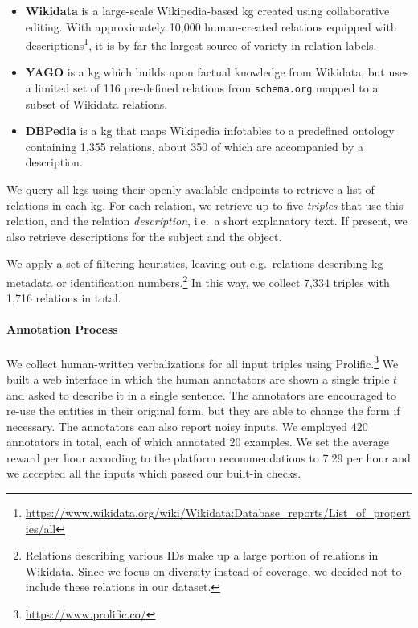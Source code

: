 \begin{itemize}
    \item \textbf{Wikidata} \cite{vrandevcic2014wikidata} is a large-scale Wikipedia-based \ac{kg} created using collaborative editing. With approximately 10,000 human-created relations equipped with descriptions\footnote{\url{https://www.wikidata.org/wiki/Wikidata:Database_reports/List_of_properties/all}}, it is by far the largest source of variety in relation labels.
    \item \textbf{YAGO} \cite{pellissier2020yago} is a \ac{kg} which builds upon factual knowledge from Wikidata, but uses a limited set of 116 pre-defined relations from \texttt{schema.org} \cite{guha2016schema} mapped to a subset of Wikidata relations.
    \item \textbf{DBPedia} \cite{auer2007dbpedia,lehmann2015dbpedia} is a \ac{kg} that maps Wikipedia infotables to a predefined ontology containing 1,355 relations, about 350 of which are accompanied by a description.
\end{itemize}

We query all \acp{kg} using their openly available endpoints to retrieve a list of relations in each \ac{kg}. For each relation, we retrieve up to five \textit{triples} that use this relation, and the relation \textit{description}, i.e.\ a short explanatory text.
If present, we also retrieve descriptions for the subject and the object.

We apply a set of filtering heuristics, leaving out e.g.\ relations describing \ac{kg} metadata or identification numbers.\footnote{Relations describing various IDs make up a large portion of relations in Wikidata. Since we focus on diversity instead of coverage, we decided not to include these relations in our dataset.} In this way, we collect 7,334 triples with 1,716 relations in total.

\paragraph{Annotation Process}
We collect human-written verbalizations for all input triples using Prolific.\footnote{\url{https://www.prolific.co/}} We built a web interface in which the human annotators are shown a single triple $t$ and asked to describe it in a single sentence. The annotators are encouraged to re-use the entities in their original form, but they are able to change the form if necessary. The annotators can also report noisy inputs. We employed 420 annotators in total, each of which annotated 20 examples. We set the average reward per hour according to the platform recommendations to  \textsterling{}7.29 per hour and we accepted all the inputs which passed our built-in checks.

